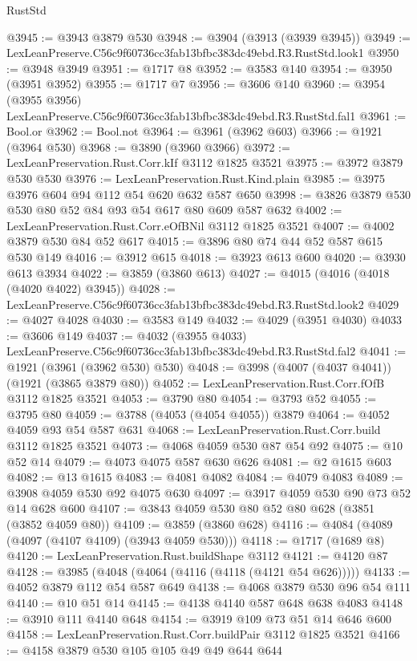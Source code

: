 \begin{lexlean}{RustStd}
\begin{coremodule}
@3945 := @3943 @3879 @530
@3948 := @3904 (@3913 (@3939 @3945))
@3949 := LexLeanPreserve.C56c9f60736cc3fab13bfbc383dc49ebd.R3.RustStd.look1
@3950 := @3948 @3949
@3951 := @1717 @8
@3952 := @3583 @140
@3954 := @3950 (@3951 @3952)
@3955 := @1717 @7
@3956 := @3606 @140
@3960 := @3954 (@3955 @3956) LexLeanPreserve.C56c9f60736cc3fab13bfbc383dc49ebd.R3.RustStd.fal1
@3961 := Bool.or
@3962 := Bool.not
@3964 := @3961 (@3962 @603)
@3966 := @1921 (@3964 @530)
@3968 := @3890 (@3960 @3966)
@3972 := LexLeanPreservation.Rust.Corr.kIf @3112 @1825 @3521
@3975 := @3972 @3879 @530 @530
@3976 := LexLeanPreservation.Rust.Kind.plain
@3985 := @3975 @3976 @604 @94 @112 @54 @620 @632 @587 @650
@3998 := @3826 @3879 @530 @530 @80 @52 @84 @93 @54 @617 @80 @609 @587 @632
@4002 := LexLeanPreservation.Rust.Corr.eOfBNil @3112 @1825 @3521
@4007 := @4002 @3879 @530 @84 @52 @617
@4015 := @3896 @80 @74 @44 @52 @587 @615 @530 @149
@4016 := @3912 @615
@4018 := @3923 @613 @600
@4020 := @3930 @613 @3934
@4022 := @3859 (@3860 @613)
@4027 := @4015 (@4016 (@4018 (@4020 @4022) @3945))
@4028 := LexLeanPreserve.C56c9f60736cc3fab13bfbc383dc49ebd.R3.RustStd.look2
@4029 := @4027 @4028
@4030 := @3583 @149
@4032 := @4029 (@3951 @4030)
@4033 := @3606 @149
@4037 := @4032 (@3955 @4033) LexLeanPreserve.C56c9f60736cc3fab13bfbc383dc49ebd.R3.RustStd.fal2
@4041 := @1921 (@3961 (@3962 @530) @530)
@4048 := @3998 (@4007 (@4037 @4041)) (@1921 (@3865 @3879 @80))
@4052 := LexLeanPreservation.Rust.Corr.fOfB @3112 @1825 @3521
@4053 := @3790 @80
@4054 := @3793 @52
@4055 := @3795 @80
@4059 := @3788 (@4053 (@4054 @4055)) @3879
@4064 := @4052 @4059 @93 @54 @587 @631
@4068 := LexLeanPreservation.Rust.Corr.build @3112 @1825 @3521
@4073 := @4068 @4059 @530 @87 @54 @92
@4075 := @10 @52 @14
@4079 := @4073 @4075 @587 @630 @626
@4081 := @2 @1615 @603
@4082 := @13 @1615
@4083 := @4081 @4082
@4084 := @4079 @4083
@4089 := @3908 @4059 @530 @92 @4075 @630
@4097 := @3917 @4059 @530 @90 @73 @52 @14 @628 @600
@4107 := @3843 @4059 @530 @80 @52 @80 @628 (@3851 (@3852 @4059 @80))
@4109 := @3859 (@3860 @628)
@4116 := @4084 (@4089 (@4097 (@4107 @4109) (@3943 @4059 @530)))
@4118 := @1717 (@1689 @8)
@4120 := LexLeanPreservation.Rust.buildShape @3112
@4121 := @4120 @87
@4128 := @3985 (@4048 (@4064 (@4116 (@4118 (@4121 @54 @626)))))
@4133 := @4052 @3879 @112 @54 @587 @649
@4138 := @4068 @3879 @530 @96 @54 @111
@4140 := @10 @51 @14
@4145 := @4138 @4140 @587 @648 @638 @4083
@4148 := @3910 @111 @4140 @648
@4154 := @3919 @109 @73 @51 @14 @646 @600
@4158 := LexLeanPreservation.Rust.Corr.buildPair @3112 @1825 @3521
@4166 := @4158 @3879 @530 @105 @105 @49 @49 @644 @644

\end{coremodule}
\end{lexlean}
